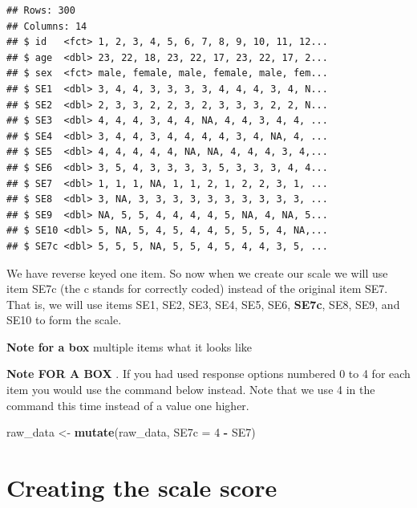 \documentclass[
]{krantz}
\makeatletter
\newenvironment{Shaded}{\begin{snugshade}}{\end{snugshade}}
\newcommand{\DataTypeTok}[1]{\textcolor[rgb]{0.27,0.27,0.27}{#1}}
\newcommand{\DecValTok}[1]{\textcolor[rgb]{0.06,0.06,0.06}{#1}}
\newcommand{\KeywordTok}[1]{\textcolor[rgb]{0.27,0.27,0.27}{\textbf{#1}}}
\newcommand{\NormalTok}[1]{#1}
\newcommand{\OperatorTok}[1]{\textcolor[rgb]{0.43,0.43,0.43}{\textbf{#1}}}
\newcommand{\OtherTok}[1]{\textcolor[rgb]{0.37,0.37,0.37}{#1}}
\newcommand{\StringTok}[1]{\textcolor[rgb]{0.5,0.5,0.5}{#1}}
\newenvironment{kframe}{%
\medskip{}
\setlength{\fboxsep}{.8em}
 \def\at@end@of@kframe{}%
 \ifinner\ifhmode%
  \def\at@end@of@kframe{\end{minipage}}%
  \begin{minipage}{\columnwidth}%
 \fi\fi%
 \def\FrameCommand##1{\hskip\@totalleftmargin \hskip-\fboxsep
 \colorbox{shadecolor}{##1}\hskip-\fboxsep
     \hskip-\linewidth \hskip-\@totalleftmargin \hskip\columnwidth}%
 \MakeFramed {\advance\hsize-\width
   \@totalleftmargin\z@ \linewidth\hsize
   \@setminipage}}%
 {\par\unskip\endMakeFramed%
 \at@end@of@kframe}
\renewenvironment{Shaded}{\begin{kframe}}{\end{kframe}}
\makeatother
\begin{document}
\begin{verbatim}
## Rows: 300
## Columns: 14
## $ id   <fct> 1, 2, 3, 4, 5, 6, 7, 8, 9, 10, 11, 12...
## $ age  <dbl> 23, 22, 18, 23, 22, 17, 23, 22, 17, 2...
## $ sex  <fct> male, female, male, female, male, fem...
## $ SE1  <dbl> 3, 4, 4, 3, 3, 3, 3, 4, 4, 4, 3, 4, N...
## $ SE2  <dbl> 2, 3, 3, 2, 2, 3, 2, 3, 3, 3, 2, 2, N...
## $ SE3  <dbl> 4, 4, 4, 3, 4, 4, NA, 4, 4, 3, 4, 4, ...
## $ SE4  <dbl> 3, 4, 4, 3, 4, 4, 4, 4, 3, 4, NA, 4, ...
## $ SE5  <dbl> 4, 4, 4, 4, 4, NA, NA, 4, 4, 4, 3, 4,...
## $ SE6  <dbl> 3, 5, 4, 3, 3, 3, 3, 5, 3, 3, 3, 4, 4...
## $ SE7  <dbl> 1, 1, 1, NA, 1, 1, 2, 1, 2, 2, 3, 1, ...
## $ SE8  <dbl> 3, NA, 3, 3, 3, 3, 3, 3, 3, 3, 3, 3, ...
## $ SE9  <dbl> NA, 5, 5, 4, 4, 4, 4, 5, NA, 4, NA, 5...
## $ SE10 <dbl> 5, NA, 5, 4, 5, 4, 4, 5, 5, 5, 4, NA,...
## $ SE7c <dbl> 5, 5, 5, NA, 5, 5, 4, 5, 4, 4, 3, 5, ...
\end{verbatim}

We have reverse keyed one item. So now when we create our scale we will use item SE7c (the c stands for correctly coded) instead of the original item SE7. That is, we will use items SE1, SE2, SE3, SE4, SE5, SE6, \textbf{SE7c}, SE8, SE9, and SE10 to form the scale.

\textbf{Note for a box} multiple items what it looks like

\textbf{Note FOR A BOX }. If you had used response options numbered 0 to 4 for each item you would use the command below instead. Note that we use 4 in the command this time instead of a value one higher.

\begin{Shaded}
\begin{Highlighting}[]
\NormalTok{raw_data <-}\StringTok{ }\KeywordTok{mutate}\NormalTok{(raw_data, }\DataTypeTok{SE7c =} \DecValTok{4} \OperatorTok{-}\StringTok{ }\NormalTok{SE7) }
\end{Highlighting}
\end{Shaded}

\hypertarget{creating-the-scale-score}{%
\section{Creating the scale score}\label{creating-the-scale-score}}

\begin{Shaded}
\end{Shaded}
\end{document}
